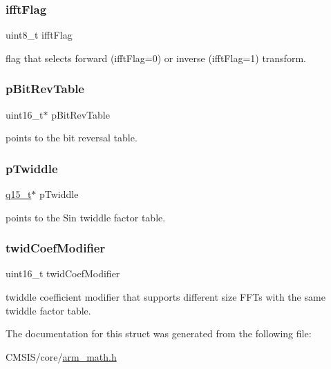 \subsubsection{\texorpdfstring{ifftFlag}{ifftFlag}}
{\footnotesize\ttfamily uint8\+\_\+t ifft\+Flag}

flag that selects forward (ifft\+Flag=0) or inverse (ifft\+Flag=1) transform. \mbox{\label{structarm__cfft__radix2__instance__q15_a46a2fb328199897af100fea0bfdf59aa}} 
\subsubsection{\texorpdfstring{pBitRevTable}{pBitRevTable}}
{\footnotesize\ttfamily uint16\+\_\+t$\ast$ p\+Bit\+Rev\+Table}

points to the bit reversal table. \mbox{\label{structarm__cfft__radix2__instance__q15_aa8c837c05b2c910342ab8f171d30dc02}} 
\subsubsection{\texorpdfstring{pTwiddle}{pTwiddle}}
{\footnotesize\ttfamily \mbox{\hyperlink{arm__math_8h_ab5a8fb21a5b3b983d5f54f31614052ea}{q15\+\_\+t}}$\ast$ p\+Twiddle}

points to the Sin twiddle factor table. \mbox{\label{structarm__cfft__radix2__instance__q15_afe772e5b5001c9d8e85032115a8df5bf}} 
\subsubsection{\texorpdfstring{twidCoefModifier}{twidCoefModifier}}
{\footnotesize\ttfamily uint16\+\_\+t twid\+Coef\+Modifier}

twiddle coefficient modifier that supports different size F\+F\+Ts with the same twiddle factor table. 

The documentation for this struct was generated from the following file\+:\begin{DoxyCompactItemize}
\item 
C\+M\+S\+I\+S/core/\mbox{\hyperlink{arm__math_8h}{arm\+\_\+math.\+h}}\end{DoxyCompactItemize}
